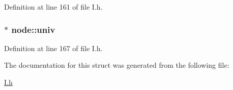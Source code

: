 \-Definition at line 161 of file \-I.\-h.

\hypertarget{structnode_a934ae7f8d66298e22149135593227f41}{
\subsubsection[{univ}]{$\ast$ {\bf node\-::univ}}}\label{structnode_a934ae7f8d66298e22149135593227f41}


\-Definition at line 167 of file \-I.\-h.



\-The documentation for this struct was generated from the following file\-:\begin{DoxyCompactItemize}
\item 
\hyperlink{I_8h}{\-I.\-h}\end{DoxyCompactItemize}
